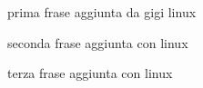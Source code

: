 \documentclass[a4paper]{article}
\begin{document}
prima frase aggiunta da gigi linux

seconda frase aggiunta con linux

terza frase aggiunta con linux
\end{document}
